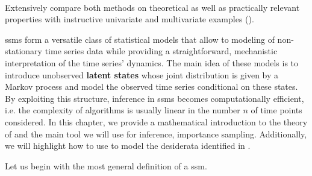 \begin{tcolorbox}[title={Contributions}]
    \paragraph{}

    \paragraph{} Extensively compare both methods on theoretical as well as practically relevant properties with instructive univariate and multivariate examples (). 
\end{tcolorbox}
\newpage

\Glspl{ssm} form a versatile class of statistical models that allow to modeling of non-stationary time series data while providing a straightforward, mechanistic interpretation of the time series' dynamics.
The main idea of these models is to introduce unobserved \textbf{latent states} whose joint distribution is given by a Markov process and model the observed time series conditional on these states.
By exploiting this structure, inference in \glspl{ssm} becomes computationally efficient, i.e. the complexity of algorithms is usually linear in the number $n$ of time points considered. 
In this chapter, we provide a mathematical introduction to the theory of  and the main tool we will use for inference, importance sampling. 
Additionally, we will highlight how to use  to model the desiderata identified in . 

Let us begin with the most general definition of a \acrshort{ssm}. 

